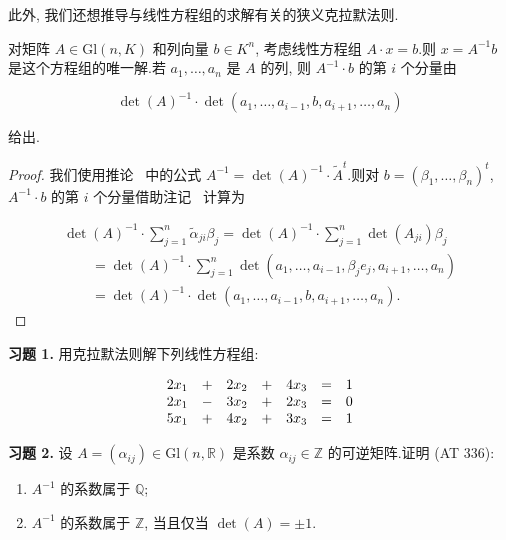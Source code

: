 此外, 我们还想推导与线性方程组的求解有关的狭义克拉默法则.

\begin{corollary}[克拉默法则]\label{cor:4.4.6}
对矩阵 $A \in \mathrm{Gl}(n, K)$ 和列向量 $b \in K^n$, 考虑线性方程组 $A \cdot x = b$.则 $x = A^{-1} b$ 是这个方程组的唯一解.若 $a_1, \ldots, a_n$ 是 $A$ 的列, 则 $A^{-1} \cdot b$ 的第 $i$ 个分量由

\[
\det(A)^{-1} \cdot \det(a_1, \ldots, a_{i-1}, b, a_{i+1}, \ldots, a_n)
\]

给出.
\end{corollary}

\begin{proof}
我们使用推论~ 中的公式 $A^{-1} = \det(A)^{-1} \cdot \tilde{A}^t$.则对 $b = (\beta_1, \ldots, \beta_n)^t$, $A^{-1} \cdot b$ 的第 $i$ 个分量借助注记~ 计算为

\[
\begin{array}{l}
\det(A)^{-1} \cdot \sum_{j = 1}^{n} \tilde{\alpha}_{ji} \beta_j = \det(A)^{-1} \cdot \sum_{j = 1}^{n} \det(A_{ji}) \beta_j \\
\qquad = \det(A)^{-1} \cdot \sum_{j = 1}^{n} \det(a_1, \ldots, a_{i-1}, \beta_j e_j, a_{i+1}, \ldots, a_n) \\
\qquad = \det(A)^{-1} \cdot \det(a_1, \ldots, a_{i-1}, b, a_{i+1}, \ldots, a_n).
\end{array}
\]
\end{proof}

\aufgaben

\noindent\textbf{习题 1.} 用克拉默法则解下列线性方程组:

\[
\begin{array}{r c r c r c r}
2x_1 & + & 2x_2 & + & 4x_3 & = & 1 \\
2x_1 & - & 3x_2 & + & 2x_3 & = & 0 \\
5x_1 & + & 4x_2 & + & 3x_3 & = & 1
\end{array}
\]

\medskip
\noindent\textbf{习题 2.} 设 $A = (\alpha_{ij}) \in \mathrm{Gl}(n, \mathbb{R})$ 是系数 $\alpha_{ij} \in \mathbb{Z}$ 的可逆矩阵.证明 (AT 336):
\begin{enumerate}
\item[(i)] $A^{-1}$ 的系数属于 $\mathbb{Q}$;
\item[(ii)] $A^{-1}$ 的系数属于 $\mathbb{Z}$, 当且仅当 $\det(A) = \pm 1$.
\end{enumerate}

